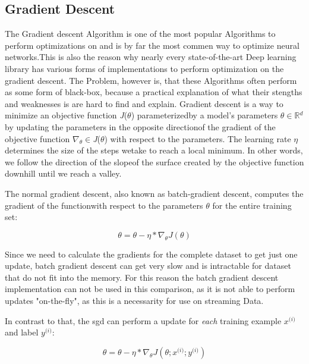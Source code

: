 \documentclass[12pt,oneside,a4paper,parskip]{scrbook}
\newcommand{\R}{\mathbb{R}}
\begin{document}
\subsection{Gradient Descent}
The Gradient descent Algorithm is one of the most popular Algorithms to perform optimizations on and is by far the most 
commen way to optimize neural networks.This is also the reason why nearly every state-of-the-art Deep learning library 
has various forms of implementations to perform optimization on the gradient descent. The Problem, however is, that these
Algorithms often perform as some form of black-box, because a practical explanation of what their stengths and weaknesses 
is are hard to find and explain.
Gradient descent is a way to minimize an objective function \textit{J}($\theta$) parameterizedby a model's parameters $\theta \in \R{}^d$ by 
updating the parameters in the opposite directionof the gradient of the objective function $\nabla_\theta \in $\textit{J}($\theta$) with respect to 
the parameters. The learning rate $\eta$ determines the size of the steps wetake to reach a local minimum. In other words, 
we follow the direction of the slopeof the surface created by the objective function downhill until we reach a valley. \cite{overvieDiffRSLVQ}

The normal gradient descent, also known as batch-gradient descent, computes the gradient of the functionwith 
respect to the parameters $\theta$ for the entire training set:

\begin{equation}
\theta = \theta - \eta * \nabla_\theta \textit{J}(\theta)
\end{equation}

Since we need to calculate the gradients for the complete dataset to get just one update, batch gradient descent can get very
slow and is intractable for dataset that do not fit into the memory. For this reason the batch gradient descent implementation can not be used in this comparison,
as it is not able to perform updates "on-the-fly", as this is a necessarity for use on streaming Data. 

In contrast to that, the \ac{sgd} can perform a update for \textit{each} training example
$\textit{x}^\textit{(i)}$ and label $\textit{y}^\textit{(i)}$:

\begin{equation}
\theta = \theta - \eta * \nabla_\theta \textit{J}(\theta;\textit{x}^\textit{(i)};\textit{y}^\textit{(i)})
\end{equation}
\end{document}
